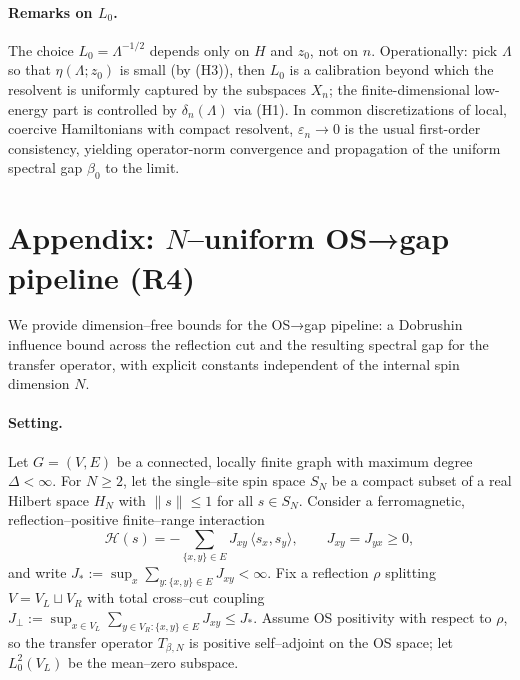 \documentclass[11pt]{amsart}
\begin{document}
\paragraph{Remarks on $L_0$.}
The choice $L_0=\Lambda^{-1/2}$ depends only on $H$ and $z_0$, not on $n$. Operationally: pick $\Lambda$ so that $\eta(\Lambda;z_0)$ is small (by (H3)), then $L_0$ is a calibration beyond which the resolvent is uniformly captured by the subspaces $X_n$; the finite-dimensional low-energy part is controlled by $\delta_n(\Lambda)$ via (H1). In common discretizations of local, coercive Hamiltonians with compact resolvent, $\varepsilon_n\to 0$ is the usual first-order consistency, yielding operator-norm convergence and propagation of the uniform spectral gap $\beta_0$ to the limit.

\section{Appendix: $N$–uniform OS→gap pipeline (R4)}

We provide dimension–free bounds for the OS→gap pipeline: a Dobrushin influence bound across the reflection cut and the resulting spectral gap for the transfer operator, with explicit constants independent of the internal spin dimension $N$.

\paragraph{Setting.}
Let $G=(V,E)$ be a connected, locally finite graph with maximum degree $\Delta<\infty$. For $N\ge 2$, let the single–site spin space $S_N$ be a compact subset of a real Hilbert space $H_N$ with $\|s\|\le 1$ for all $s\in S_N$. Consider a ferromagnetic, reflection–positive finite–range interaction
\[
  \mathcal{H}(s)= -\sum_{\{x,y\}\in E} J_{xy}\,\langle s_x,s_y\rangle,\qquad J_{xy}=J_{yx}\ge 0,
\]
and write $J_{\!*}:=\sup_x \sum_{y:\{x,y\}\in E} J_{xy}<\infty$. Fix a reflection $\rho$ splitting $V=V_L\sqcup V_R$ with total cross–cut coupling $J_{\perp}:=\sup_{x\in V_L}\sum_{y\in V_R:\{x,y\}\in E} J_{xy}\le J_{\!*}$. Assume OS positivity with respect to $\rho$, so the transfer operator $T_{\beta,N}$ is positive self–adjoint on the OS space; let $L^2_0(V_L)$ be the mean–zero subspace.
\end{document}
